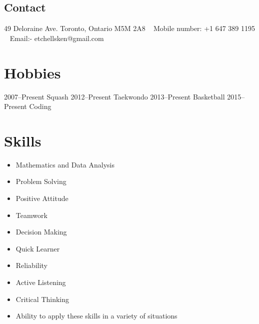 \documentclass[]{cv-style}          %
\begin{document}

\newpage




\begin{aside}
%
\section{Contact}
49 Deloraine Ave.
Toronto, Ontario
M5M 2A8
~
Mobile number:
+1 647 389 1195
~
Email:-
etchellsken@gmail.com
%
\end{aside}


\section{Hobbies}
\begin{entrylist}
    \entry
            {2007--Present}
            {Squash}{}{}
    \entry
            {2012--Present}
            {Taekwondo}{}
            {}
    \entry
            {2013--Present}
            {Basketball}{}{}
    \entry
        {2015--Present}
        {Coding}{}{}
\end{entrylist}

\section{Skills}
\begin{itemize}
    \item Mathematics and Data Analysis
    \item Problem Solving
    \item Positive Attitude
    \item Teamwork
    \item Decision Making
    \item Quick Learner
    \item Reliability
    \item Active Listening
    \item Critical Thinking
    \item Ability to apply these skills in a variety of situations
\end{itemize}
\end{document}
